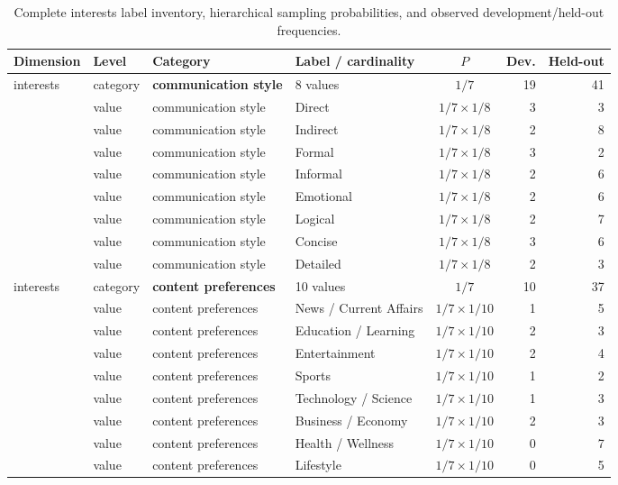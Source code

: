 \documentclass{ieeeaccess}
\begin{document}
\renewcommand{\thetable}{S2d}
\begin{table}[H]
\centering
\footnotesize
\renewcommand{\arraystretch}{0.92}
\caption{Complete interests label inventory, hierarchical sampling probabilities, and observed development/held-out frequencies.}
\label{tab:persona-schema-interests}
\begin{tabularx}{\textwidth}{l l l X c r r}
\toprule
Dimension & Level & Category & Label / cardinality & $P$ & Dev. & Held-out \\
\midrule
interests & category & \textbf{communication style} & 8 values & $1/7$ & 19 & 41 \\
 & value & communication style & Direct & $1/7\times1/8$ & 3 & 3 \\
 & value & communication style & Indirect & $1/7\times1/8$ & 2 & 8 \\
 & value & communication style & Formal & $1/7\times1/8$ & 3 & 2 \\
 & value & communication style & Informal & $1/7\times1/8$ & 2 & 6 \\
 & value & communication style & Emotional & $1/7\times1/8$ & 2 & 6 \\
 & value & communication style & Logical & $1/7\times1/8$ & 2 & 7 \\
 & value & communication style & Concise & $1/7\times1/8$ & 3 & 6 \\
 & value & communication style & Detailed & $1/7\times1/8$ & 2 & 3 \\
interests & category & \textbf{content preferences} & 10 values & $1/7$ & 10 & 37 \\
 & value & content preferences & News / Current Affairs & $1/7\times1/10$ & 1 & 5 \\
 & value & content preferences & Education / Learning & $1/7\times1/10$ & 2 & 3 \\
 & value & content preferences & Entertainment & $1/7\times1/10$ & 2 & 4 \\
 & value & content preferences & Sports & $1/7\times1/10$ & 1 & 2 \\
 & value & content preferences & Technology / Science & $1/7\times1/10$ & 1 & 3 \\
 & value & content preferences & Business / Economy & $1/7\times1/10$ & 2 & 3 \\
 & value & content preferences & Health / Wellness & $1/7\times1/10$ & 0 & 7 \\
 & value & content preferences & Lifestyle & $1/7\times1/10$ & 0 & 5 \\

\end{tabularx}
\end{table}
\end{document}
